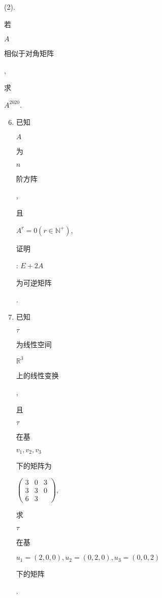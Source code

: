 \documentclass[10pt]{article}
\begin{document}
(2). \begin{CJK}{UTF8}{mj}若\end{CJK} $A$ \begin{CJK}{UTF8}{mj}相似于对角矩阵\end{CJK}, \begin{CJK}{UTF8}{mj}求\end{CJK} $A^{2020}$.

\begin{enumerate}
  \setcounter{enumi}{5}
  \item \begin{CJK}{UTF8}{mj}已知\end{CJK} $A$ \begin{CJK}{UTF8}{mj}为\end{CJK} $n$ \begin{CJK}{UTF8}{mj}阶方阵\end{CJK}, \begin{CJK}{UTF8}{mj}且\end{CJK} $A^{r}=0\left(r \in \mathbb{N}^{+}\right)$, \begin{CJK}{UTF8}{mj}证明\end{CJK}: $E+2 A$ \begin{CJK}{UTF8}{mj}为可逆矩阵\end{CJK}.

  \item \begin{CJK}{UTF8}{mj}已知\end{CJK} $\tau$ \begin{CJK}{UTF8}{mj}为线性空间\end{CJK} $\mathbb{R}^{3}$ \begin{CJK}{UTF8}{mj}上的线性变换\end{CJK}, \begin{CJK}{UTF8}{mj}且\end{CJK} $\tau$ \begin{CJK}{UTF8}{mj}在基\end{CJK} $v_{1}, v_{2}, v_{3}$ \begin{CJK}{UTF8}{mj}下的矩阵为\end{CJK} $\left(\begin{array}{ccccc}3 & 0 & 3 \\ 3 & 3 & 0 \\ 6 & 3\end{array}\right)$, \begin{CJK}{UTF8}{mj}求\end{CJK} $\tau$ \begin{CJK}{UTF8}{mj}在基\end{CJK} $u_{1}=(2,0,0), u_{2}=(0,2,0), u_{3}=(0,0,2)$ \begin{CJK}{UTF8}{mj}下的矩阵\end{CJK}.


\end{enumerate}
\end{document}
